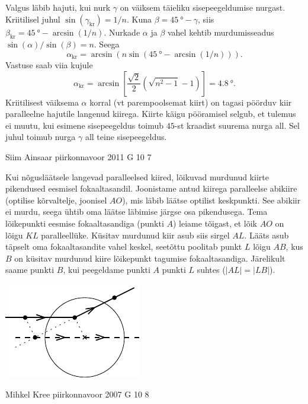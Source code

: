 \documentclass[11pt, twoside]{article}
\begin{document}
{{Valgus läbib hajuti, kui nurk $\gamma$ on väiksem täieliku sisepeegeldumise nurgast. Kriitilisel juhul $\sin(\gamma_\mathrm{kr})=1/n$. Kuna $\beta=\SI{45}{\degree}-\gamma$, siis $\beta_\mathrm{kr} = \SI{45}{\degree}-\arcsin(1/n)$. Nurkade $\alpha$ ja $\beta$ vahel kehtib murdumisseadus $\sin(\alpha)/\sin(\beta)=n$. Seega
\[
\alpha_\mathrm{kr}=\arcsin(n\sin(\SI{45}{\degree}-\arcsin(1/n))).
\]
Vastuse saab viia kujule
\[
\alpha_\mathrm{kr}=\arcsin\left[\frac{\sqrt2}{2}(\sqrt{n^2-1}-1)\right] = \SI{4.8}{\degree}.
\]
Kriitilisest väiksema $\alpha$ korral (vt parempoolsemat kiirt) on tagasi pöörduv kiir paralleelne hajutile langenud kiirega. Kiirte käigu pööramisel selgub, et tulemus ei muutu, kui esimene sisepeegeldus toimub $45$-st kraadist suurema nurga all. Sel juhul toimub nurga $\gamma$ all teine sisepeegeldus.
\fi
}

{Siim Ainsaar} %
{piirkonnavoor} %
{2011} %
{G 10} %
{7} %
{

\ifSolution
Kui nõgusläätsele langevad paralleelsed kiired, lõikuvad
murdunud kiirte pikendused eesmisel fokaaltasandil. Joonistame antud kiirega paralleelse abikiire (optilise kõrvaltelje, joonisel $AO$), mis läbib läätse optilist keskpunkti. See abikiir ei murdu, seega ühtib oma läätse läbimise järgse osa pikendusega. Tema lõikepunkti eesmise fokaaltasandiga (punkti $A$) leiame tõigast, et lõik $AO$ on lõigu
$KL$ paralleellüke. Küsitav murdunud kiir asub siis sirgel $AL$. Lääts asub täpselt oma
fokaaltasandite vahel keskel, seetõttu poolitab punkt $L$ lõigu $AB$, kus $B$ on küsitav murdunud kiire lõikepunkt tagumise fokaaltasandiga. Järelikult saame punkti $B$, kui peegeldame punkti $A$ punkti $L$ suhtes ($|AL| = |LB|$).

\begin{center}
	\includegraphics[width=0.5\linewidth]{2011-v2g-10-lah}
\end{center}
\fi
}

{Mihkel Kree} %
{piirkonnavoor} %
{2007} %
{G 10} %
{8} %
{

}}
\end{document}
